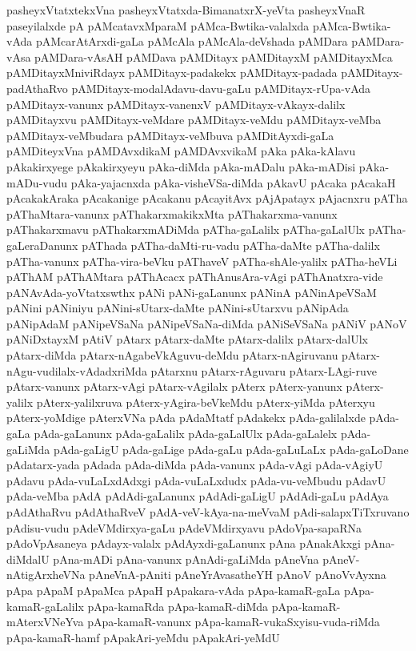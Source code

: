 {pasheyxVtatxtekxVna
pasheyxVtatxda-BimanatxrX-yeVta
pasheyxVnaR
paseyilalxde
pA
pAMcatavxMparaM
pAMca-Bwtika-valalxda
pAMca-Bwtika-vAda
pAMcarAtArxdi-gaLa
pAMcAla
pAMcAla-deVshada
pAMDara
pAMDara-vAsa
pAMDara-vAsAH
pAMDava
pAMDitayx
pAMDitayxM
pAMDitayxMca
pAMDitayxMniviRdayx
pAMDitayx-padakekx
pAMDitayx-padada
pAMDitayx-padAthaRvo
pAMDitayx-modalAdavu-davu-gaLu
pAMDitayx-rUpa-vAda
pAMDitayx-vanunx
pAMDitayx-vanenxV
pAMDitayx-vAkayx-dalilx
pAMDitayxvu
pAMDitayx-veMdare
pAMDitayx-veMdu
pAMDitayx-veMba
pAMDitayx-veMbudara
pAMDitayx-veMbuva
pAMDitAyxdi-gaLa
pAMDiteyxVna
pAMDAvxdikaM
pAMDAvxvikaM
pAka
pAka-kAlavu
pAkakirxyege
pAkakirxyeyu
pAka-diMda
pAka-mADalu
pAka-mADisi
pAka-mADu-vudu
pAka-yajacnxda
pAka-visheVSa-diMda
pAkavU
pAcaka
pAcakaH
pAcakakAraka
pAcakanige
pAcakanu
pAcayitAvx
pAjApatayx
pAjacnxru
pATha
pAThaMtara-vanunx
pAThakarxmakikxMta
pAThakarxma-vanunx
pAThakarxmavu
pAThakarxmADiMda
pATha-gaLalilx
pATha-gaLalUlx
pATha-gaLeraDanunx
pAThada
pATha-daMti-ru-vadu
pATha-daMte
pATha-dalilx
pATha-vanunx
pATha-vira-beVku
pAThaveV
pATha-shAle-yalilx
pATha-heVLi
pAThAM
pAThAMtara
pAThAcacx
pAThAnusAra-vAgi
pAThAnatxra-vide
pANAvAda-yoVtatxswthx
pANi
pANi-gaLanunx
pANinA
pANinApeVSaM
pANini
pANiniyu
pANini-sUtarx-daMte
pANini-sUtarxvu
pANipAda
pANipAdaM
pANipeVSaNa
pANipeVSaNa-diMda
pANiSeVSaNa
pANiV
pANoV
pANiDxtayxM
pAtiV
pAtarx
pAtarx-daMte
pAtarx-dalilx
pAtarx-dalUlx
pAtarx-diMda
pAtarx-nAgabeVkAguvu-deMdu
pAtarx-nAgiruvanu
pAtarx-nAgu-vudilalx-vAdadxriMda
pAtarxnu
pAtarx-rAguvaru
pAtarx-LAgi-ruve
pAtarx-vanunx
pAtarx-vAgi
pAtarx-vAgilalx
pAterx
pAterx-yanunx
pAterx-yalilx
pAterx-yalilxruva
pAterx-yAgira-beVkeMdu
pAterx-yiMda
pAterxyu
pAterx-yoMdige
pAterxVNa
pAda
pAdaMtatf
pAdakekx
pAda-galilalxde
pAda-gaLa
pAda-gaLanunx
pAda-gaLalilx
pAda-gaLalUlx
pAda-gaLalelx
pAda-gaLiMda
pAda-gaLigU
pAda-gaLige
pAda-gaLu
pAda-gaLuLaLx
pAda-gaLoDane
pAdatarx-yada
pAdada
pAda-diMda
pAda-vanunx
pAda-vAgi
pAda-vAgiyU
pAdavu
pAda-vuLaLxdAdxgi
pAda-vuLaLxdudx
pAda-vu-veMbudu
pAdavU
pAda-veMba
pAdA
pAdAdi-gaLanunx
pAdAdi-gaLigU
pAdAdi-gaLu
pAdAya
pAdAthaRvu
pAdAthaRveV
pAdA-veV-kAya-na-meVvaM
pAdi-salapxTiTxruvano
pAdisu-vudu
pAdeVMdirxya-gaLu
pAdeVMdirxyavu
pAdoVpa-sapaRNa
pAdoVpAsaneya
pAdayx-valalx
pAdAyxdi-gaLanunx
pAna
pAnakAkxgi
pAna-diMdalU
pAna-mADi
pAna-vanunx
pAnAdi-gaLiMda
pAneVna
pAneV-nAtigArxheVNa
pAneVnA-pAniti
pAneYrAvasatheYH
pAnoV
pAnoVvAyxna
pApa
pApaM
pApaMca
pApaH
pApakara-vAda
pApa-kamaR-gaLa
pApa-kamaR-gaLalilx
pApa-kamaRda
pApa-kamaR-diMda
pApa-kamaR-mAterxVNeYva
pApa-kamaR-vanunx
pApa-kamaR-vukaSxyisu-vuda-riMda
pApa-kamaR-hamf
pApakAri-yeMdu
pApakAri-yeMdU
}
